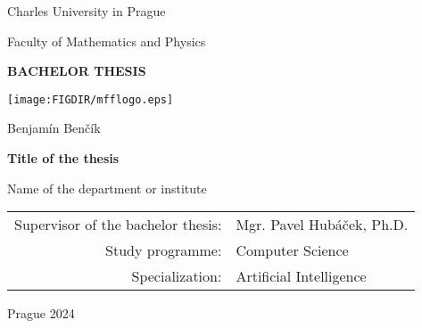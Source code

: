 
\pagestyle{empty}
\begin{center}

{\large Charles University in Prague}

\medskip
{\large Faculty of Mathematics and Physics}

\vfill
{\bfseries\Large BACHELOR THESIS}

\vfill
\centerline{\mbox{\texttt{[image: \\FIGDIR/mfflogo.eps]}}}

\vfill
\vspace{5mm}

{\LARGE Benjamín Benčík}

\vspace{15mm}

{\LARGE\bfseries Title of the thesis}

\vfill

Name of the department or institute

\vfill

\begin{tabular}{rl}
Supervisor of the bachelor thesis: & Mgr. Pavel Hubáček, Ph.D. \\   
\noalign{\vspace{2mm}}
Study programme: & Computer Science\\
\noalign{\vspace{2mm}}
Specialization: & Artificial Intelligence\\
\end{tabular}

\vfill

Prague 2024

\end{center}


